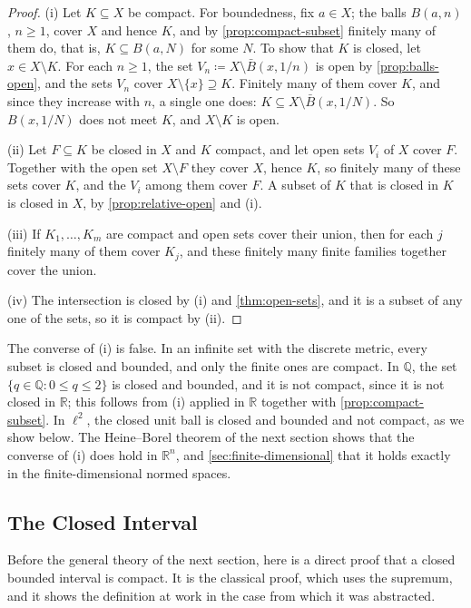\begin{proof}
(i) Let $K\subseteq X$ be compact. For boundedness, fix $a\in X$; the balls $B(a,n)$, $n\ge1$, cover $X$ and hence $K$, and by \cref{prop:compact-subset} finitely many of them do, that is, $K\subseteq B(a,N)$ for some $N$. To show that $K$ is closed, let $x\in X\setminus K$. For each $n\ge1$, the set $V_n\coloneqq X\setminus\bar B(x,1/n)$ is open by \cref{prop:balls-open}, and the sets $V_n$ cover $X\setminus\{x\}\supseteq K$. Finitely many of them cover $K$, and since they increase with $n$, a single one does: $K\subseteq X\setminus\bar B(x,1/N)$. So $B(x,1/N)$ does not meet $K$, and $X\setminus K$ is open.

(ii) Let $F\subseteq K$ be closed in $X$ and $K$ compact, and let open sets $V_i$ of $X$ cover $F$. Together with the open set $X\setminus F$ they cover $X$, hence $K$, so finitely many of these sets cover $K$, and the $V_i$ among them cover $F$. A subset of $K$ that is closed in $K$ is closed in $X$, by \cref{prop:relative-open} and (i).

(iii) If $K_1,\ldots,K_m$ are compact and open sets cover their union, then for each $j$ finitely many of them cover $K_j$, and these finitely many finite families together cover the union.

(iv) The intersection is closed by (i) and \cref{thm:open-sets}, and it is a subset of any one of the sets, so it is compact by (ii).
\end{proof}

The converse of (i) is false. In an infinite set with the discrete metric, every subset is closed and bounded, and only the finite ones are compact. In $\mathbb Q$, the set $\{q\in\mathbb Q: 0\le q\le2\}$ is closed and bounded, and it is not compact, since it is not closed in $\mathbb R$; this follows from (i) applied in $\mathbb R$ together with \cref{prop:compact-subset}. In $\ell^2$, the closed unit ball is closed and bounded and not compact, as we show below. The Heine--Borel theorem of the next section shows that the converse of (i) does hold in $\mathbb R^n$, and \cref{sec:finite-dimensional} that it holds exactly in the finite-dimensional normed spaces.

\subsection{The Closed Interval}

Before the general theory of the next section, here is a direct proof that a closed bounded interval is compact. It is the classical proof, which uses the supremum, and it shows the definition at work in the case from which it was abstracted.

